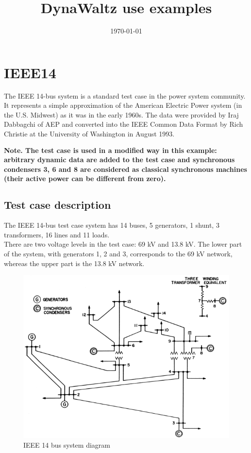 \documentclass[a4paper, 12pt]{report}
\begin{document}
\title{DynaWaltz use examples}
\date\today

\maketitle
\tableofcontents

\chapter{IEEE14}

The IEEE 14-bus system is a standard test case in the power system community. It represents a simple approximation of the American Electric Power system (in the U.S. Midwest) as it was in the early 1960s. The data were provided by Iraj Dabbagchi of AEP and converted into the IEEE Common Data Format by Rich Christie at the University of Washington in August 1993.

\textbf{Note. The test case is used in a modified way in this example: arbitrary dynamic data are added to the test case and synchronous condensers 3, 6 and 8 are considered as classical synchronous machines (their active power can be different from zero).}

\section{Test case description}

The IEEE 14-bus test case system has 14 buses, 5 generators, 1 shunt, 3 transformers, 16 lines and 11 loads.\\
There are two voltage levels in the test case: 69 kV and 13.8 kV. The lower part of the system, with generators 1, 2 and 3, corresponds to the 69 kV network, whereas the upper part is the 13.8 kV network.

\begin{figure}[H]
  \includegraphics[width=\textwidth]{Single-line-diagram-of-IEEE-14-bus-system.png}
  \caption{IEEE 14 bus system diagram}
\end{figure}
\end{document}
